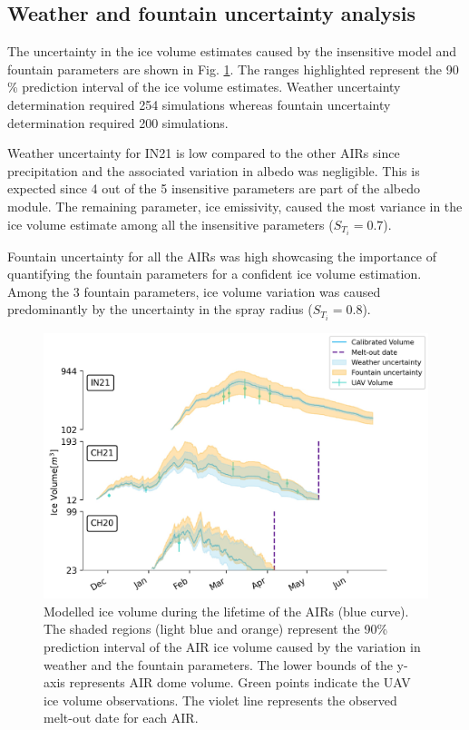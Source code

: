 \documentclass[utf8]{frontiersSCNS} %
\begin{document}
\subsection{Weather and fountain uncertainty analysis}

The uncertainty in the ice volume estimates caused by the insensitive model and fountain parameters are shown in
Fig. \ref{fig:results}. The ranges highlighted represent the 90 \% prediction interval of the ice volume estimates.
Weather uncertainty determination required 254 simulations whereas fountain uncertainty determination required 200 simulations.

Weather uncertainty for IN21 is low compared to the other AIRs since precipitation and the associated variation in
albedo was negligible. This is expected since 4 out of the 5 insensitive parameters are part of the albedo module.
The remaining parameter, ice emissivity, caused the most variance in the ice volume estimate among all the
insensitive parameters ($S_{T_{i}} = 0.7$).

Fountain uncertainty for all the AIRs was high showcasing the importance of quantifying the fountain parameters for
a confident ice volume estimation. Among the 3 fountain parameters, ice volume variation was caused predominantly
by the uncertainty in the spray radius ($S_{T_{i}} = 0.8$).

\begin{figure}
	\begin{center}
		\includegraphics[width=\linewidth]{Figures/icev_results.jpg}
	\end{center}
	\caption{Modelled ice volume during the lifetime of the AIRs (blue curve). The shaded regions (light blue and orange)
		represent the 90\% prediction interval of the AIR ice volume caused by the variation in weather and the fountain parameters.
		The lower bounds of the y-axis represents AIR dome volume. Green points indicate the UAV ice volume observations.
		The violet line represents the observed melt-out date for each AIR.  }

	\label{fig:results}
\end{figure}
\end{document}
